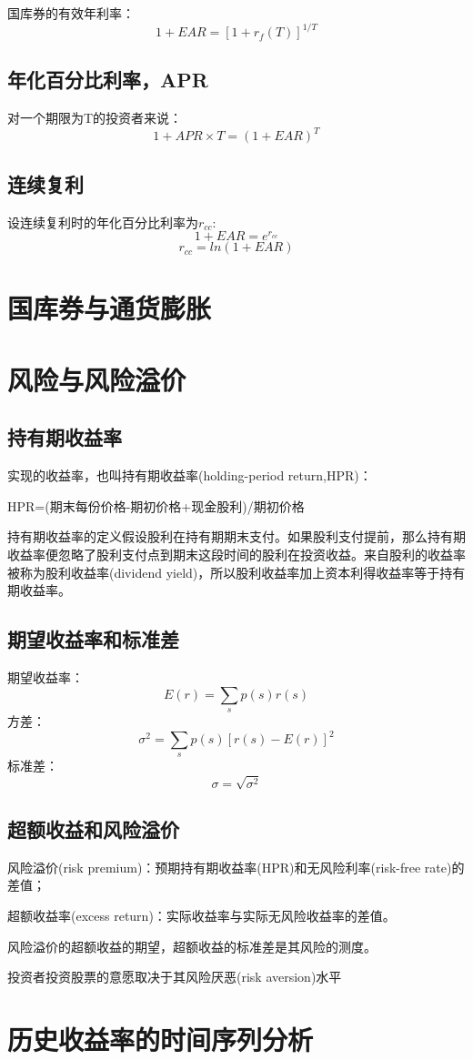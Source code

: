 \documentclass{article}
\begin{document}
国库券的有效年利率：
\[
1+EAR=[1+r_f(T)]^{1/T}
\]

\subsection{年化百分比利率，APR}
对一个期限为T的投资者来说：
\[
1+APR\times T=(1+EAR)^T
\]
\subsection{连续复利}
设连续复利时的年化百分比利率为$ r_{cc} $:
\[
1+EAR=e^{r_{cc}}
\]
\[
r_{cc}=ln(1+EAR)
\]
\section{国库券与通货膨胀}

\section{风险与风险溢价}
\subsection{持有期收益率}
实现的收益率，也叫持有期收益率(holding-period return,HPR)：

HPR=(期末每份价格-期初价格+现金股利)/期初价格

持有期收益率的定义假设股利在持有期期末支付。如果股利支付提前，那么持有期收益率便忽略了股利支付点到期末这段时间的股利在投资收益。来自股利的收益率被称为股利收益率(dividend yield)，所以股利收益率加上资本利得收益率等于持有期收益率。

\subsection{期望收益率和标准差}
期望收益率：
\[
E(r)=\sum_sp(s)r(s)
\]
方差：
\[
\sigma^2=\sum_sp(s)[r(s)-E(r)]^2
\]
标准差：
\[
\sigma=\sqrt{\sigma^2}
\]
\subsection{超额收益和风险溢价}
风险溢价(risk premium)：预期持有期收益率(HPR)和无风险利率(risk-free rate)的差值；

超额收益率(excess return)：实际收益率与实际无风险收益率的差值。

风险溢价的超额收益的期望，超额收益的标准差是其风险的测度。

投资者投资股票的意愿取决于其风险厌恶(risk aversion)水平
\section{历史收益率的时间序列分析}
\end{document}
